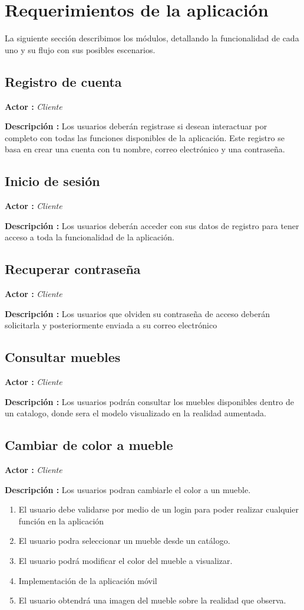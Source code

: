 \section{Requerimientos de la aplicación}
La siguiente sección describimos los módulos, detallando la funcionalidad de cada uno y su flujo con sus posibles escenarios.\par

\subsection{Registro de cuenta}
\textbf{Actor :} \textit{Cliente} \par
\textbf{Descripción :} Los usuarios deberán registrase si desean interactuar por completo con todas las funciones disponibles de la aplicación. Este registro se basa en crear una cuenta con tu nombre, correo electrónico y una contraseña.
\subsection{Inicio de sesión}
\textbf{Actor :} \textit{Cliente} \par
\textbf{Descripción :} Los usuarios deberán acceder con sus datos de registro para tener acceso a toda la funcionalidad de la aplicación.
\subsection{Recuperar contraseña}
\textbf{Actor :} \textit{Cliente} \par
\textbf{Descripción :} Los usuarios que olviden su contraseña de acceso deberán solicitarla y posteriormente enviada a su correo electrónico

\subsection{Consultar muebles}
\textbf{Actor :} \textit{Cliente} \par
\textbf{Descripción :} Los usuarios podrán consultar los muebles disponibles dentro de un catalogo, donde sera el modelo visualizado en la realidad aumentada.

\subsection{Cambiar de color a mueble}
\textbf{Actor :} \textit{Cliente} \par
\textbf{Descripción :} Los usuarios podran cambiarle el color a un mueble.




\begin{enumerate}[1.]
\item El usuario debe validarse por medio de un login para poder realizar cualquier función en la aplicación
\item El usuario podra seleccionar un mueble desde un catálogo. 
\item El usuario podrá modificar el color del mueble a visualizar. 
\item Implementación de la aplicación móvil 
\item El usuario obtendrá una imagen del mueble sobre la realidad que observa.
\end{enumerate}